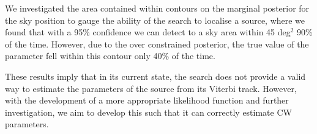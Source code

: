 We investigated the area contained within contours on the marginal posterior for the sky position to gauge the ability of the search to localise a source, where we found that with a 95\% confidence we can detect to a sky area within 45 deg$^2$ 90\% of the time. 
However, due to the over constrained posterior, the true value of the parameter fell within this contour only 40\% of the time.

These results imply that in its current state, the search does not provide a valid way to estimate the parameters of the source from its Viterbi track.
However, with the development of a more appropriate likelihood function and further investigation, we aim to develop this such that it can correctly estimate \gls{CW} parameters.



















